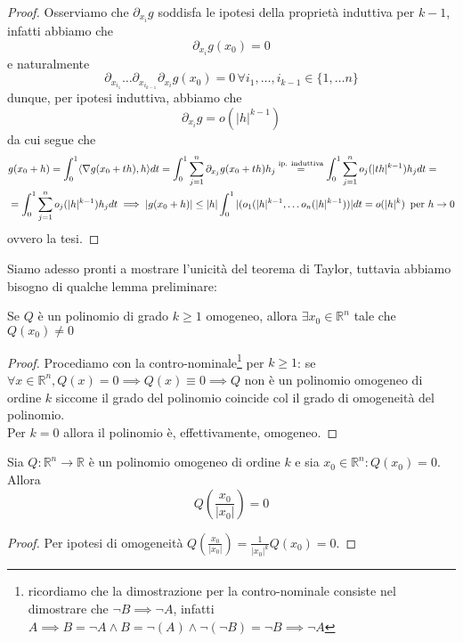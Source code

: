 \begin{proof}
Osserviamo che $\partial_{x_i} g$ soddisfa le ipotesi della proprietà induttiva per $k-1$, infatti abbiamo che
$$
\partial_{x_i} g(x_0) = 0
$$
e naturalmente
$$
\partial_{x_{i_1}} \ldots \partial_{x_{i_{k-1}}} \partial_{x_i} g(x_0) = 0 \, \forall i_1, \ldots, i_{k-1} \in \{1, \ldots n\}
$$
dunque, per ipotesi induttiva, abbiamo che
$$
\partial_{x_i} g = o(|h|^{k-1})
$$
da cui segue che
\begin{align*}
&g(x_0 + h) = \int_0^1 \langle \nabla g(x_0 + th), h \rangle dt = \int_0^1 \sum_{j=1}^n \partial_{x_j} g(x_0 + th)h_j \stackrel{\text{ip. induttiva}}{=} \int_0^1 \sum_{j=1}^n o_j(|th|^{k-1})h_j dt = \\ &= \int_0^1 \sum_{j=1}^n o_j(|h|^{k-1})h_j dt \implies |g(x_0+h)| \leq |h| \int_0^1 |(o_1(|h|^{k-1}, \ldots o_n(|h|^{k-1}))|dt = o(|h|^k) \, \text{ per } h \to 0
\end{align*}
ovvero la tesi.
\end{proof}
Siamo adesso pronti a mostrare l'unicità del teorema di Taylor, tuttavia abbiamo bisogno di qualche lemma preliminare:
\begin{lemma}
Se $Q$ è un polinomio di grado $k \geq 1$ omogeneo, allora $\exists x_0 \in \mathbb{R}^n$ tale che $Q(x_0) \neq 0$ 
\end{lemma}
\begin{proof}
Procediamo con la contro-nominale\footnote{ricordiamo che la dimostrazione per la contro-nominale consiste nel dimostrare che $\neg B \implies \neg A$, infatti $A \implies B = \neg A \wedge B = \neg{(A)} \wedge \neg(\neg B) = \neg B \implies \neg A$} per $k \geq 1$: se $\forall x \in \mathbb{R}^n, Q(x) = 0 \implies Q(x) \equiv 0 \implies Q$ non è un polinomio omogeneo di ordine $k$ siccome il grado del polinomio coincide col il grado di omogeneità del polinomio. \\
Per $k=0$ allora il polinomio è, effettivamente, omogeneo.
\end{proof}
\begin{cor}
Sia $Q: \mathbb{R}^n \to \mathbb{R}$ è un polinomio omogeneo di ordine $k$ e sia $x_0 \in \mathbb{R}^n : Q(x_0) = 0$. Allora
$$
Q \left( \frac{x_0}{|x_0|} \right) = 0
$$
\end{cor}
\begin{proof}
Per ipotesi di omogeneità $Q(\frac{x_0}{|x_0|}) = \frac{1}{|x_0|^k}Q(x_0) = 0$.
\end{proof}
